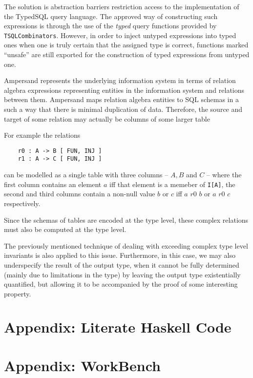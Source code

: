 \begin{description}[leftmargin=1em]
  The solution is abstraction barriers restriction access to the implementation of
  the TypedSQL query language. The approved way of constructing such expressions
  is through the use of the \emph{typed} query functions provided by
  \texttt{TSQLCombinators}. However, in order to inject untyped expressions
  into typed ones when one is truly certain that the assigned type is correct,
  functions marked ``unsafe'' are still exported for the construction of 
  typed expressions from untyped one. 

\item[Relationship between SQL schemata and relation algebra]
  Ampersand represents the underlying information system in terms of relation algebra
  expressions representing entities in the information system and relations between them.
  Ampersand maps relation algebra entities to SQL schemas in a such a way that 
  there is minimal duplication of data. Therefore, the source and target of some 
  relation may actually be columns of some larger table 

  For example the relations 
  \begin{verbatim} 
    r0 : A -> B [ FUN, INJ ] 
    r1 : A -> C [ FUN, INJ ]  
  \end{verbatim}
  \vspace{-2em}
  can be modelled as a single table with three columns -- $A, B$ and $C$ --
  where the first column contains an element $a$ iff that element is a memeber
  of \texttt{I[A]}, the second and third columns contain a non-null value $b$ or
  $c$ iff $a\,\,r0\,\,b$ or $a\,\,r0\,\,c$ respectively. 

 Since the schemas of tables are encoded at the type level, these complex relations
  must also be computed at the type level.

  The previously mentioned technique of dealing with exceeding complex type level invariants
  is also applied to this issue. Furthermore, in this case, we may also underspecify the 
  result of the output type, when it cannot be fully determined (mainly due to limitations 
  in the type) by leaving the output type existentially quantified, but allowing it to 
  be accompanied by the proof of some interesting property. 

\end{description} 

\chapter*{Appendix: Literate Haskell Code}

\chapter*{Appendix: WorkBench}\label{appen:WorkBench}
